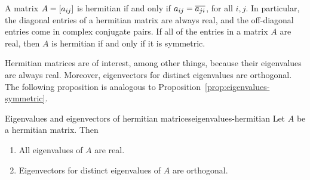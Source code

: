 A matrix $A=\left[a_{ij}\right]$ is hermitian if and only if
$a_{ij} = \overline{a_{ji}}$, for all $i,j$. In particular, the
diagonal entries of a hermitian matrix are always real, and the
off-diagonal entries come in complex conjugate pairs. If all of the
entries in a matrix $A$ are real, then $A$ is hermitian if and only if
it is symmetric.

Hermitian matrices are of interest, among other things, because their
eigenvalues are always real. Moreover, eigenvectors for distinct
eigenvalues are orthogonal. The following proposition is analogous to
Proposition~\ref{prop:eigenvalues-symmetric}.

\begin{proposition}{Eigenvalues and eigenvectors of hermitian matrices}{eigenvalues-hermitian}
  Let $A$ be a hermitian matrix. Then
  \begin{enumialphparenastyle}
    \begin{enumerate}
    \item All eigenvalues of $A$ are real.
    \item Eigenvectors for distinct eigenvalues of $A$ are orthogonal.
    \end{enumerate}
  \end{enumialphparenastyle}
\end{proposition}

